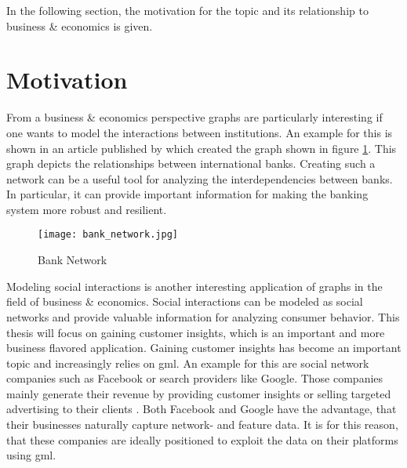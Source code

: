 	\noindent In the following section, the motivation for the topic and its
	relationship to business \& economics is given. 

	\section{Motivation}

	\noindent From a business \& economics perspective graphs are particularly
	interesting if one wants to model the interactions between institutions. An 
	example for this is shown in an article published by 
	\cite{schweitzer2009economic} which created the graph shown in figure
	\ref{fig:bank_network}. This graph depicts the relationships between 
	international banks. Creating such a network can be a useful tool for 
	analyzing the interdependencies between banks. In particular, it can 
	provide important information for making the banking system more robust and 
	resilient. 

	\begin{figure}[h]
		\centering
		\texttt{[image: bank\_network.jpg]}
		\caption{Bank Network}
		\cite[p. 424]{schweitzer2009economic}
		\label{fig:bank_network}
	\end{figure} 

	\noindent Modeling social interactions is another interesting application
	of graphs in the field of business \& economics. Social interactions can be
	modeled as social networks and provide valuable information for analyzing
	consumer behavior. This thesis will focus on gaining customer insights,
	which is an important and more business flavored application. Gaining
	customer insights has become an important topic and increasingly relies on
	\acs{gml}. An example for this are social network companies such as 
	Facebook or search providers like Google. Those companies mainly generate 
	their revenue by providing customer insights or selling targeted 
	advertising to their clients \citep{Facebook2021,Alphabet2021}. Both 
	Facebook and Google have the advantage, that their businesses naturally 
	capture network- and feature data. It is for this reason, that these
	companies are ideally positioned to exploit the data on their platforms
	using \acs{gml}. \\

